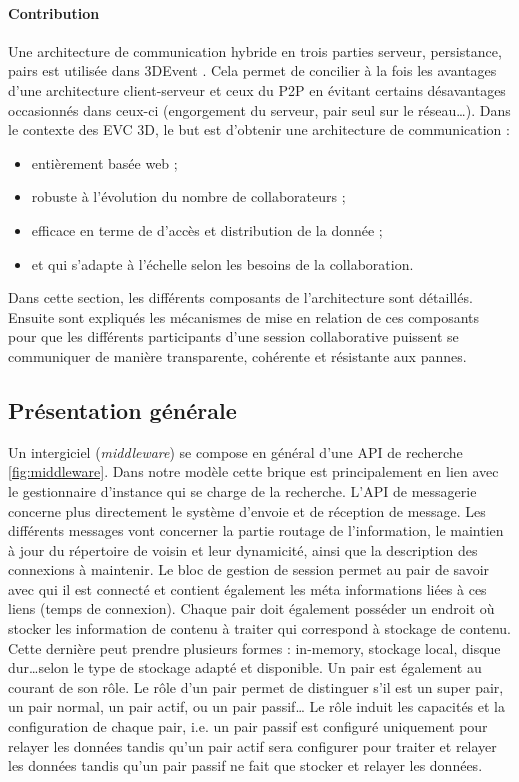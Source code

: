 

\paragraph{Contribution}
Une architecture de communication hybride en trois parties serveur, persistance, 
pairs est utilisée dans 3DEvent \cite{Desprat2016}. Cela permet de concilier à la 
fois les avantages d'une architecture client-serveur et ceux du \gls{P2P} en évitant 
certains désavantages occasionnés dans ceux-ci (engorgement du serveur, pair 
seul sur le réseau\dots). Dans le contexte des \gls{EVC} \gls{3D}, le but 
est d'obtenir une architecture de communication : 

\begin{itemize}
	\item entièrement basée web ; 
	\item robuste à l'évolution du nombre de collaborateurs ; 
	\item efficace en terme de d'accès et distribution de la donnée ; 
	\item et qui s'adapte à l'échelle selon les besoins de la collaboration.
\end{itemize}

Dans cette section, les différents composants de l'architecture sont détaillés. 
Ensuite sont expliqués les mécanismes de mise en relation de 
ces composants pour que les différents participants d'une session 
collaborative puissent se communiquer de manière transparente, cohérente et 
résistante aux pannes.


\subsection{Présentation générale}
Un intergiciel (\textit{middleware}) se compose en général d'une \gls{API} de 
recherche \ref{fig:middleware}.
Dans notre modèle cette brique est principalement en lien avec le 
gestionnaire d'instance qui se charge de la recherche. L'\gls{API} de messagerie 
concerne plus directement le système d'envoie et de réception de message. Les 
différents messages vont concerner la partie routage de l'information, le 
maintien à jour du répertoire de voisin et leur dynamicité, ainsi que la 
description des connexions à maintenir. Le bloc de gestion de session permet au 
pair de savoir avec qui il est connecté et contient également les méta informations 
liées à ces liens (temps de connexion). 
Chaque pair doit également posséder un endroit où stocker les information de 
contenu à traiter qui correspond à stockage de contenu. Cette dernière peut 
prendre plusieurs formes : in-memory, stockage local, disque dur\dots selon le 
type de stockage adapté et disponible.
Un pair est également au courant de son rôle. Le rôle d'un pair permet de 
distinguer s'il est un super pair, un pair normal, un pair actif, ou un pair passif\dots 
Le rôle induit les capacités et la configuration de chaque pair, i.e. un pair passif 
est configuré uniquement pour relayer les données tandis qu'un pair actif sera 
configurer pour traiter et relayer les données tandis qu'un pair passif ne fait que 
stocker et relayer les données.

